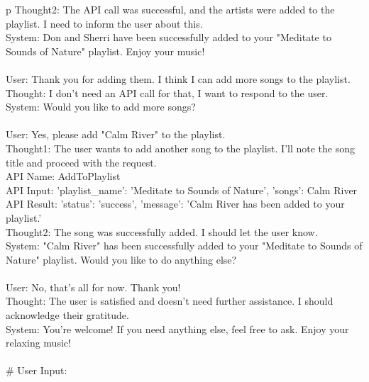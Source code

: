 \begin{table*}[!t]
\begin{tabular}{p\linewidth}
Thought2: The API call was successful, and the artists were added to the playlist. I need to inform the user about this.   \\
System: Don and Sherri have been successfully added to your "Meditate to Sounds of Nature" playlist. Enjoy your music!   \\
 \\
User: Thank you for adding them. I think I can add more songs to the playlist. \\
Thought: I don't need an API call for that, I want to respond to the user.  \\
System: Would you like to add more songs?   \\
 \\
User: Yes, please add "Calm River" to the playlist.   \\
Thought1: The user wants to add another song to the playlist. I'll note the song title and proceed with the request.   \\
API Name: AddToPlaylist   \\
API Input: {'playlist\_name': 'Meditate to Sounds of Nature', 'songs': Calm River}   \\
API Result: {'status': 'success', 'message': 'Calm River has been added to your playlist.'}   \\
Thought2: The song was successfully added. I should let the user know.   \\
System: "Calm River" has been successfully added to your "Meditate to Sounds of Nature" playlist. Would you like to do anything else?   \\
 \\
User: No, that's all for now. Thank you!   \\
Thought: The user is satisfied and doesn't need further assistance. I should acknowledge their gratitude.   \\
System: You're welcome! If you need anything else, feel free to ask. Enjoy your relaxing music! \\
 \\
\# User Input:\\
\bottomrule
\end{tabular}
\caption{API-driven conversation prompt to generate SGD fine-tuning samples with GPT4-o. Only functions used across all dialogues are included due to their large number.}
\label{tab: prompt}
\end{table*}
